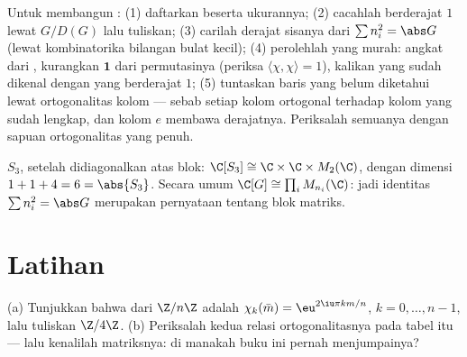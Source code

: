 \begin{method}\label{met:b3:representations:table}
Untuk membangun : (1) daftarkan  beserta ukurannya;
(2) cacahlah  berderajat $1$ lewat $G/D(G)$ lalu tuliskan; (3)
carilah derajat sisanya dari $\sum n_i^2 = \abs G$ (lewat kombinatorika
bilangan bulat kecil); (4) perolehlah  yang murah: angkat dari
, kurangkan $\mathbf 1$ dari  permutasinya
(periksa $\langle\chi,\chi\rangle = 1$), kalikan  yang sudah dikenal
dengan yang berderajat $1$; (5) tuntaskan baris yang belum diketahui lewat ortogonalitas
kolom --- sebab setiap kolom ortogonal terhadap kolom yang
sudah lengkap, dan kolom $e$ membawa derajatnya. Periksalah
semuanya dengan sapuan ortogonalitas yang penuh.
\end{method}

\begin{omfigure}

{\small {} $S_3$, setelah didiagonalkan atas blok:
$\C[S_3] \cong \C \times \C \times M_2(\C)$, dengan dimensi $1 + 1 +
4 = 6 = \abs{S_3}$. Secara umum $\C[G] \cong \prod_i
M_{n_i}(\C)$: jadi identitas $\sum n_i^2 = \abs G$ merupakan pernyataan
tentang blok matriks.}
\end{omfigure}

\section{Latihan}

\begin{exercise}[$\star$]\label{exo:b3:representations:1}
(a) Tunjukkan bahwa   dari $\Z/n\Z$ adalah
$\chi_k(\bar m) = \eu^{2\iu\pi km/n}$, $k = 0, \dots, n-1$, lalu
tuliskan  $\Z/4\Z$.
(b) Periksalah kedua relasi ortogonalitasnya pada tabel itu --- lalu kenalilah
matriksnya: di manakah buku ini pernah menjumpainya?
\end{exercise}

